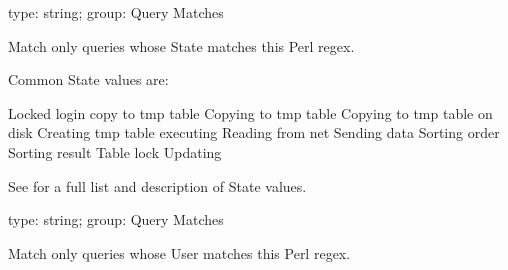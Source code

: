 \documentclass[letterpaper,10pt,english]{sphinxmanual}
\begin{document}
\begin{fulllineitems}
\label{\detokenize{mariadb-kill:cmdoption-mariadb-kill-match-state}}
type: string; group: Query Matches

Match only queries whose State matches this Perl regex.

Common State values are:

\begin{sphinxVerbatim}[commandchars=\\\{\}]
Locked
login
copy to tmp table
Copying to tmp table
Copying to tmp table on disk
Creating tmp table
executing
Reading from net
Sending data
Sorting  order
Sorting result
Table lock
Updating
\end{sphinxVerbatim}

See  for
a full list and description of State values.

\end{fulllineitems}


\begin{fulllineitems}
\label{\detokenize{mariadb-kill:cmdoption-mariadb-kill-match-user}}
type: string; group: Query Matches

Match only queries whose User matches this Perl regex.

\end{fulllineitems}

\end{document}
